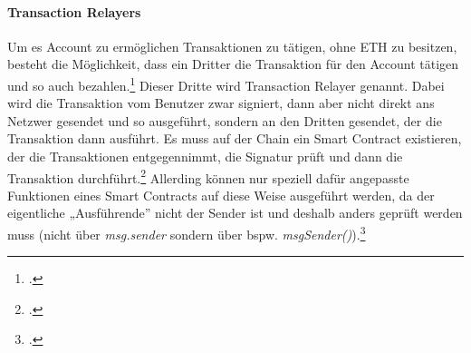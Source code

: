 \paragraph{Transaction Relayers}
\label{sec:definition-transaction-relayers}
Um es Account zu ermöglichen Transaktionen zu tätigen, ohne ETH zu besitzen, besteht die Möglichkeit, dass ein Dritter die Transaktion für den Account tätigen und so auch bezahlen.\footcites[Vgl. hierzu, zum Folgenden und weiterführend][]{w24}[]{w26}
Dieser Dritte wird Transaction Relayer genannt.
Dabei wird die Transaktion vom Benutzer zwar signiert, dann aber nicht direkt ans Netzwer gesendet und so ausgeführt, sondern an den Dritten gesendet, der die Transaktion dann ausführt.
Es muss auf der Chain ein Smart Contract existieren, der die Transaktionen entgegennimmt, die Signatur prüft und dann die Transaktion durchführt.\footcite[Vgl.][]{w25}
Allerding können nur speziell dafür angepasste Funktionen eines Smart Contracts auf diese Weise ausgeführt werden, da der eigentliche „Ausführende” nicht der Sender ist und deshalb anders geprüft werden muss (nicht über \textit{msg.sender} sondern über bspw. \textit{msgSender()}).\footcites[Vgl.][]{w27}[]{w24}